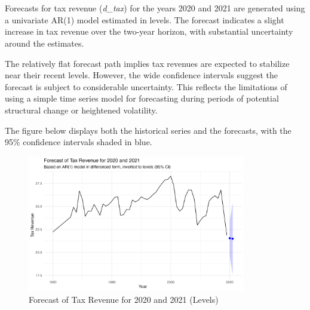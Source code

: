 \documentclass[a4paper,12pt]{article}
\begin{document}
\section{}

Forecasts for tax revenue (\textit{d\_tax}) for the years 2020 and 2021 are generated using a univariate AR(1) model estimated in levels. The forecast indicates a slight increase in tax revenue over the two-year horizon, with substantial uncertainty around the estimates.






The relatively flat forecast path implies tax revenues are expected to stabilize near their recent levels. However, the wide confidence intervals suggest the forecast is subject to considerable uncertainty. This reflects the limitations of using a simple time series model for forecasting during periods of potential structural change or heightened volatility.

The figure below displays both the historical series and the forecasts, with the 95\% confidence intervals shaded in blue.

\begin{figure}[H]
  \centering
  \includegraphics[width=0.85\textwidth]{../results/d_tax_forecast_plot.png}
  \caption{Forecast of Tax Revenue for 2020 and 2021 (Levels)}
\end{figure}
\end{document}
